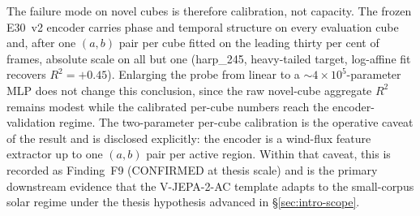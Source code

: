 The failure mode on novel cubes is therefore calibration, not
capacity. The frozen E30~v2 encoder carries phase and temporal
structure on every evaluation cube and, after one $(a, b)$ pair
per cube fitted on the leading thirty per cent of frames,
absolute scale on all but one (harp\_245, heavy-tailed target,
log-affine fit recovers $R^{2} = +0.45$). Enlarging the probe
from linear to a $\sim\!4 \times 10^{5}$-parameter MLP does not
change this conclusion, since the raw novel-cube aggregate
$R^{2}$ remains modest while the calibrated per-cube numbers
reach the encoder-validation regime. The two-parameter per-cube
calibration is the operative caveat of the result and is
disclosed explicitly: the encoder is a wind-flux feature
extractor up to one $(a, b)$ pair per active region. Within that
caveat, this is recorded as Finding~F9 (CONFIRMED at thesis
scale) and is the primary downstream evidence that the
V-JEPA-2-AC template adapts to the small-corpus solar regime
under the thesis hypothesis advanced in \S\ref{sec:intro-scope}.


